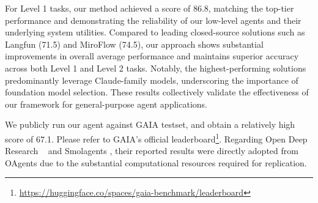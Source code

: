 For Level 1 tasks, our method achieved a score of 86.8, matching the top-tier performance and demonstrating the reliability of our low-level agents and their underlying system utilities. Compared to leading closed-source solutions such as Langfun (71.5) and MiroFlow (74.5), our approach shows substantial improvements in overall average performance and maintains superior accuracy across both Level 1 and Level 2 tasks. Notably, the highest-performing solutions predominantly leverage Claude-family models, underscoring the importance of foundation model selection. These results collectively validate the effectiveness of our framework for general-purpose agent applications.

We publicly run our agent against GAIA testset, and obtain a relatively high score of 67.1. Please refer to GAIA's official leaderboard\footnote{\url{https://huggingface.co/spaces/gaia-benchmark/leaderboard}}. Regarding Open Deep Research ~\cite{opendeepresearch} and Smolagents \cite{smolagents}, their reported results were directly adopted from OAgents \cite{oagent} due to the substantial computational resources required for replication.

